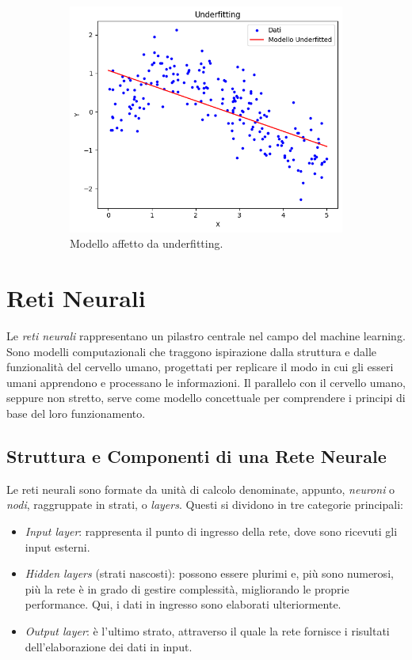 \documentclass[12pt,a4paper,twoside,openright]{book}
\begin{document}
\begin{figure}
\quad
    \begin{subfigure}[b]{0.3\textwidth}
    \includegraphics[width=\textwidth]{images/underfitting.png}
    \caption{Modello affetto da underfitting.}
    \end{subfigure}
\caption{}
\label{fig:over_under_fitting}
\end{figure}


\section{Reti Neurali}
Le \emph{reti neurali} rappresentano un pilastro centrale nel campo del machine learning. Sono modelli computazionali che traggono ispirazione dalla struttura e dalle funzionalità del cervello umano, progettati per replicare il modo in cui gli esseri umani apprendono e processano le informazioni. Il parallelo con il cervello umano, seppure non stretto, serve come modello concettuale per comprendere i principi di base del loro funzionamento.

\subsection{Struttura e Componenti di una Rete Neurale}
Le reti neurali sono formate da unità di calcolo denominate, appunto, \emph{neuroni} o \emph{nodi}, raggruppate in strati, o \emph{layers}. Questi si dividono in tre categorie principali:
\begin{itemize}
    \item \emph{Input layer}: rappresenta il punto di ingresso della rete, dove sono ricevuti gli input esterni.
    \item \emph{Hidden layers} (strati nascosti): possono essere plurimi e, più sono numerosi, più la rete è in grado di gestire complessità, migliorando le proprie performance. Qui, i dati in ingresso sono elaborati ulteriormente.
    \item \emph{Output layer}: è l'ultimo strato, attraverso il quale la rete fornisce i risultati dell'elaborazione dei dati in input.
\end{itemize}
\end{document}
